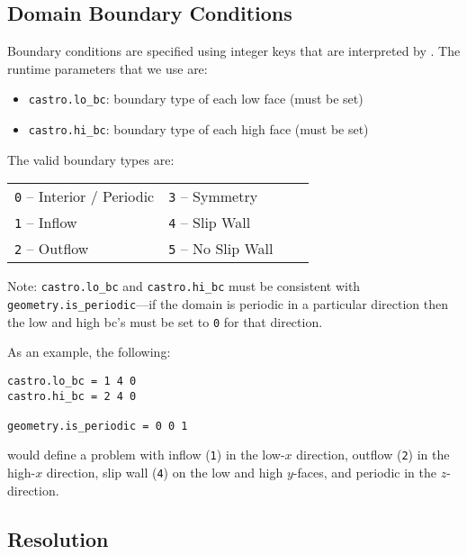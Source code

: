 \subsection{Domain Boundary Conditions}

Boundary conditions are specified using integer keys that are interpreted
by \boxlib.  The runtime parameters that we use are:
\begin{itemize}
\item {\tt castro.lo\_bc}: boundary type of each low face  (must be set)
\item {\tt castro.hi\_bc}: boundary type of each high face (must be set)
\end{itemize}

The valid boundary types are:
\begin{table*}[h]
\begin{center}
\begin{tabular}{llll} 
{\tt 0} --  Interior / Periodic \hspace{1.in} & {\tt 3}  --  Symmetry     \hspace{1.in} & \\
{\tt 1} --  Inflow              \hspace{1.in} & {\tt 4}  --  Slip Wall    \hspace{1.in}& \\
{\tt 2} --  Outflow             \hspace{1.in} & {\tt 5}  --  No Slip Wall \hspace{1.in}& \\
\end{tabular}
\end{center}
\end{table*}

\noindent Note: {\tt castro.lo\_bc} and {\tt castro.hi\_bc} must be consistent with 
{\tt geometry.is\_periodic}---if the domain is periodic in a particular
direction then the low and high bc's must be set to {\tt 0} for that direction.

As an example, the following:
\begin{lstlisting}
castro.lo_bc = 1 4 0 
castro.hi_bc = 2 4 0 

geometry.is_periodic = 0 0 1
\end{lstlisting}
would define a problem with inflow ({\tt 1}) in the low-$x$ direction,
outflow ({\tt 2}) in the high-$x$ direction, slip wall ({\tt 4}) on
the low and high $y$-faces, and periodic in the $z$-direction.

\subsection{Resolution}

